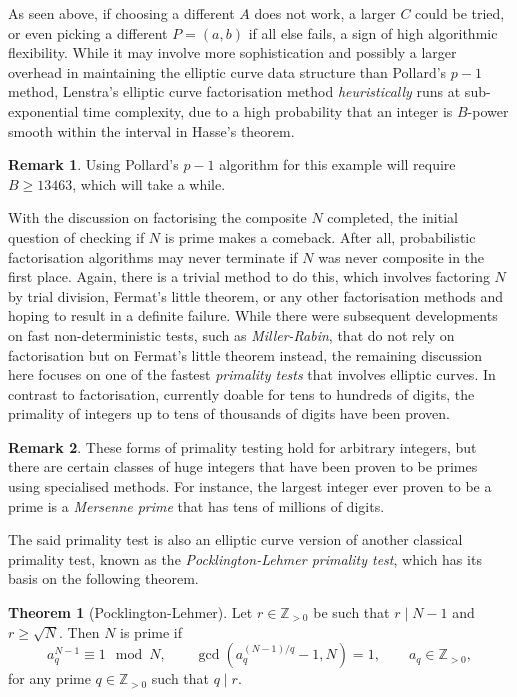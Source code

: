 \documentclass{article}
\newcommand{\Z}{\mathbb{Z}}
\newcommand{\rb}[1]{\left( #1 \right)}
\theoremstyle{definition}\newtheorem*{definition}{Definition}
\theoremstyle{definition}\newtheorem*{example}{Example}
\theoremstyle{definition}\newtheorem*{remark}{Remark}
\newtheorem{theorem}[proposition]{Theorem}
\begin{document}
As seen above, if choosing a different $ A $ does not work, a larger $ C $ could be tried, or even picking a different $ P = \rb{a, b} $ if all else fails, a sign of high algorithmic flexibility. While it may involve more sophistication and possibly a larger overhead in maintaining the elliptic curve data structure than Pollard's $ p - 1 $ method, Lenstra's elliptic curve factorisation method \emph{heuristically} runs at sub-exponential time complexity, due to a high probability that an integer is $ B $-power smooth within the interval in Hasse's theorem.

\begin{remark}
Using Pollard's $ p - 1 $ algorithm for this example will require $ B \ge 13463 $, which will take a while.
\end{remark}

With the discussion on factorising the composite $ N $ completed, the initial question of checking if $ N $ is prime makes a comeback. After all, probabilistic factorisation algorithms may never terminate if $ N $ was never composite in the first place. Again, there is a trivial method to do this, which involves factoring $ N $ by trial division, Fermat's little theorem, or any other factorisation methods and hoping to result in a definite failure. While there were subsequent developments on fast non-deterministic tests, such as \emph{Miller-Rabin}, that do not rely on factorisation but on Fermat's little theorem instead, the remaining discussion here focuses on one of the fastest \emph{primality tests} that involves elliptic curves. In contrast to factorisation, currently doable for tens to hundreds of digits, the primality of integers up to tens of thousands of digits have been proven.

\begin{remark}
These forms of primality testing hold for arbitrary integers, but there are certain classes of huge integers that have been proven to be primes using specialised methods. For instance, the largest integer ever proven to be a prime is a \emph{Mersenne prime} that has tens of millions of digits.
\end{remark}

The said primality test is also an elliptic curve version of another classical primality test, known as the \emph{Pocklington-Lehmer primality test}, which has its basis on the following theorem.

\begin{theorem}[Pocklington-Lehmer]
\label{thm:pocklington}
Let $ r \in \Z_{> 0} $ be such that $ r \mid N - 1 $ and $ r \ge \sqrt{N} $. Then $ N $ is prime if
$$ a_q^{N - 1} \equiv 1 \mod N, \qquad \gcd\rb{a_q^{\rb{N - 1} / q} - 1, N} = 1, \qquad a_q \in \Z_{> 0}, $$
for any prime $ q \in \Z_{> 0} $ such that $ q \mid r $.
\end{theorem}
\end{document}

